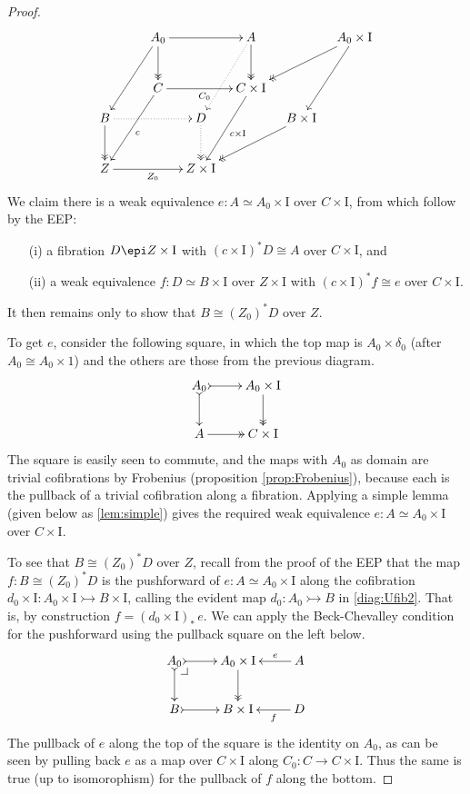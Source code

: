 \documentclass[12pt]{article}
\makeatletter
\newcommand{\pbcorner}[1][dr]{\save*!/#1-1.2pc/#1:(-1,1)@^{|-}\restore}
\newcommand{\ra}{\ensuremath{\rightarrow}}
\newcommand{\cof}{\ensuremath{\rightarrowtail}}
\newcommand{\fib}{\ensuremath{\epi}}
\newcommand{\I}{\ensuremath{\mathrm{I}}}
\theoremstyle{remark}
\theoremstyle{definition}
\makeatother
\begin{document}
\begin{proof}
\begin{equation}
\begin{gathered}
\xymatrix@=1em{
&& \ar[llddd] A_0 \ar@{->>}[dd] \ar[rr]  &&  \ar@{..>}[lddd] A \ar@{->>}[dd] &&  \ar@{->>}[lldd] A_0\times\I \ar[lddd]  \\
&& && &&\\
&& \ar[llddd]^c C \ar[rr]_{C_0}  &&  \ar[lddd]^{c\times\I} C\times\I && \\
B \ar@{->>}[dd] \ar@{..>}[rrr] &&& D \ar@{..>>}[dd] && \ar@{->>}[lldd] B\times\I &\\
&&&& &&\\
Z \ar[rrr]_{Z_0} &&& Z\times\I &&&
}
\end{gathered}
\end{equation}
We claim there is a weak equivalence $e:A \simeq A_0\times \I$ over $C\times \I$, from which follow  by the EEP:

\begin{enumerate}
\item[(i)] a fibration $D\fib Z\times \I$ with $(c\times\I)^*D \cong A$ over $C\times\I$, and 
\item[(ii)] a weak equivalence $f:D\simeq B\times\I$ over $Z\times \I$ with $(c\times\I)^*f \cong e$ over $C\times\I$. 
\end{enumerate}
It then remains only to show that $B\cong (Z_0)^*D$ over $Z$.

To get $e$, consider the following square, in which the top map is $A_0\times \delta_0$ (after $A_0\cong A_0\times 1$) and the others are those from the previous diagram.
\begin{equation}\label{diag:Ufibn}
\xymatrix{
A_0 \ar@{>->}[d] \ar@{>->}[r] & A_0\times\I \ar@{>>}[d] \\
A  \ar@{>>}[r] &  C\times\I 
}
\end{equation}
The square is easily seen to commute, and the maps with $A_0$ as domain are trivial cofibrations by Frobenius (proposition \ref{prop:Frobenius}), because each is the pullback of a trivial cofibration along a fibration.
Applying a simple lemma (given below as \ref{lem:simple}) gives the required weak equivalence $e:A \simeq A_0\times \I$ over $C\times \I$.  

To see that $B\cong (Z_0)^*D$ over $Z$, recall from the proof of the EEP that the map $f:B\cong (Z_0)^*D$ is the pushforward of  $e:A \simeq A_0\times \I$ along the cofibration $d_0\times\I :A_0\times\I \cof B\times\I$, calling the evident map $d_0:A_0\cof B$ in \eqref{diag:Ufib2}.  That is, by construction $f = (d_0\times\I)_*\,e$.  We can apply the Beck-Chevalley condition for the pushforward using the pullback square on the left below.
\begin{equation}
\xymatrix{
A_0 \ar@{>->}[d] \ar@{>->}[r] \pbcorner & A_0\times\I \ar@{>>}[d] & \ar[l]_-e A\\
B  \ar@{>->}[r]  &  B\times\I  & \ar[l]^-f D
}
\end{equation}
The pullback of $e$ along the top of the square is the identity on $A_0$, as can be seen by pulling back $e$ as a map over $C\times \I$ along $C_0 :  C\ra C\times\I$.
Thus the same is true (up to isomorophism) for the pullback of $f$ along the bottom.


\end{proof}
\end{document}
